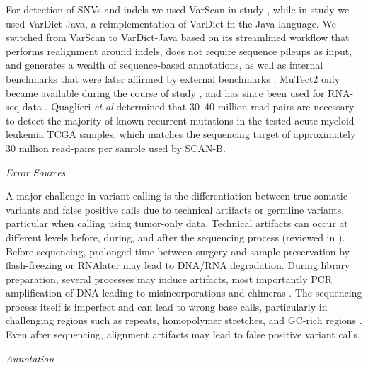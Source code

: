 \documentclass[11pt]{book}
\newcommand{\scanb}{\mbox{SCAN-B}}
\begin{document}
For detection of SNVs and indels we used VarScan \cite{Koboldt:2012} in study \I, while in study \IV we used VarDict-Java, a reimplementation of VarDict \cite{Lai:2016} in the Java language. We switched from VarScan to VarDict-Java based on its streamlined workflow that performs realignment around indels, does not require sequence pileups as input, and generates a wealth of sequence-based annotations, as well as internal benchmarks that were later affirmed by external benchmarks \cite{Sandmann:2017, Bian:2018, Quaglieri:2020}. MuTect2 \cite{Benjamin:2019} only became available during the course of study \IV, and has since been used for RNA-seq data \cite{Coudray:2018, Yizhak:2019}. Quaglieri \textit{et al} \cite{Quaglieri:2020} determined that 30--40 million read-pairs are necessary to detect the majority of known recurrent mutations in the tested acute myeloid leukemia TCGA samples, which matches the sequencing target of approximately 30 million read-pairs per sample used by \scanb{}.

\vspace{1em}
\textit{Error Sources}

A major challenge in variant calling is the differentiation between true somatic variants and false positive calls due to technical artifacts or germline variants, particular when calling using tumor-only data. Technical artifacts can occur at different levels before, during, and after the sequencing process (reviewed in \cite{Salk:2018}). Before sequencing, prolonged time between surgery and sample preservation by flash-freezing or RNAlater may lead to DNA/RNA degradation. During library preparation, several processes may induce artifacts, most importantly PCR amplification of DNA leading to misincorporations and chimeras \cite{Brodin:2013, Kebschull:2015, PotapovOng:2017}. The sequencing process itself is imperfect and can lead to wrong base calls, particularly in challenging regions such as repeats, homopolymer stretches, and GC-rich regions \cite{Minoche:2011, Benjamini:2012, Ross:2013, Schirmer:2016}. Even after sequencing, alignment artifacts may lead to false positive variant calls.

\vspace{1em}
\textit{Annotation}
\end{document}
